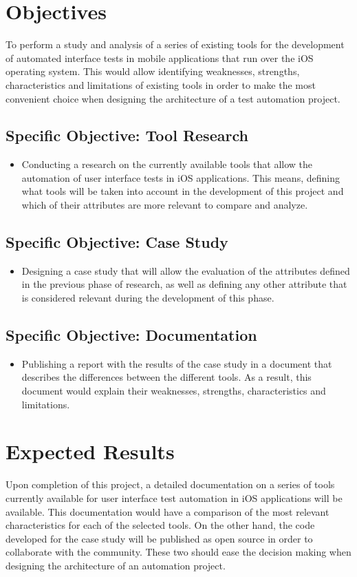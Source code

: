 \section{Objectives}
To perform a study and analysis of a series of existing tools for the development of automated interface tests in mobile applications that run over the iOS operating system. This would allow identifying weaknesses, strengths, characteristics and limitations of existing tools in order to make the most convenient choice when designing the architecture of a test automation project.

\subsection{Specific Objective: Tool Research}
\begin{itemize}
	\item Conducting a research on the currently available tools that allow the automation of user interface tests in iOS applications. This means, defining what tools will be taken into account in the development of this project and which of their attributes are more relevant to compare and analyze.
\end{itemize}
\subsection{Specific Objective: Case Study}
\begin{itemize}
	\item Designing a case study that will allow the evaluation of the attributes defined in the previous phase of research, as well as defining any other attribute that is considered relevant during the development of this phase.
\end{itemize}
\subsection{Specific Objective: Documentation}
\begin{itemize}
	\item Publishing a report with the results of the case study in a document that describes the differences between the different tools. As a result, this document would explain their weaknesses, strengths, characteristics and limitations.
\end{itemize}

\section{Expected Results}
Upon completion of this project, a detailed documentation on a series of tools currently available for user interface test automation in iOS applications will be available. This documentation would have a comparison of the most relevant characteristics for each of the selected tools. On the other hand, the code developed for the case study will be published as open source in order to collaborate with the community. These two should ease the decision making when designing the architecture of an automation project.